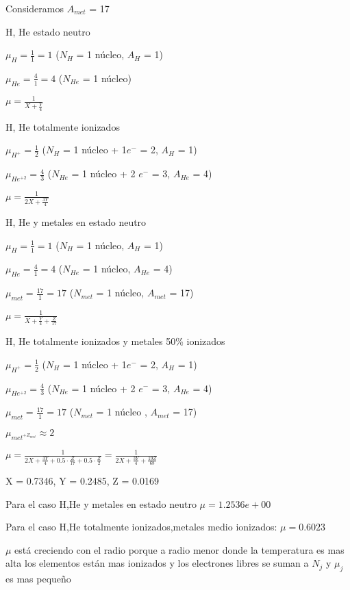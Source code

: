 \documentclass[10pt]{book}
\begin{document}
Consideramos $A_{met}$ = 17

\begin{description}
\item H, He estado neutro

$ \mu_H  = \frac{1}{1} = 1$ ($N_H$ = 1 núcleo, $A_H$ = 1)

$ \mu_{He}  = \frac{4}{1} = 4$ ($N_{He}$ = 1 núcleo)

$ \mu = \frac{1}{X + \frac{Y}{4}}$
 
\item H, He totalmente ionizados

$ \mu_{H^+}  = \frac{1}{2} $ ($N_H$ = 1 núcleo + 1$e^-$ = 2, $A_H$ = 1)

$ \mu_{He^{+2}}  = \frac{4}{3} $ ($N_{He}$ = 1 núcleo + 2 $e^-$ = 3, $A_{He}$ = 4)

$ \mu = \frac{1}{2X + \frac{3Y}{4}}$

\item H, He y metales en estado neutro

$ \mu_H  = \frac{1}{1} = 1$ ($N_H$ = 1 núcleo, $A_H$ = 1)

$ \mu_{He}  = \frac{4}{1} = 4$ ($N_{He}$ = 1 núcleo, $A_{He}$ = 4)

$ \mu_{met}  = \frac{17}{1} = 17$ ($N_{met}$ = 1 núcleo, $A_{met}$ = 17)

$ \mu = \frac{1}{X + \frac{Y}{4} + \frac{Z}{17}}$

\item H, He totalmente ionizados y metales 50\% ionizados

$ \mu_{H^+}  = \frac{1}{2} $ ($N_H$ = 1 núcleo + 1$e^-$ = 2, $A_H$ = 1)

$ \mu_{He^{+2}}  = \frac{4}{3} $ ($N_{He}$ = 1 núcleo + 2 $e^-$ = 3, $A_{He}$ = 4)

$ \mu_{met}  = \frac{17}{1} = 17 $ ($N_{met}$ = 1 núcleo , $A_{met}$ = 17)

$ \mu_{met^{+Z_{met}}}  \approx 2  $ 

$ \mu = \frac{1}{2 X + \frac{3 Y}{4} + 0.5 \cdot \frac{Z}{17} + 0.5 \cdot \frac{Z}{2} } = \frac{1}{2 X + \frac{3 Y}{4} + \frac{19 Z}{68} }$

\item X = 0.7346, Y = 0.2485, Z = 0.0169

Para el caso H,He y metales en estado neutro  $ \mu = 1.2536e+00 $

Para el caso H,He totalmente ionizados,metales medio ionizados:  $\mu = 0.6023$

$\mu$ está creciendo con el radio porque a radio menor donde la temperatura es mas alta los elementos están mas ionizados y los electrones libres se suman a $N_j$ y $ \mu_j $ es mas pequeño


\end{description}
\end{document}

